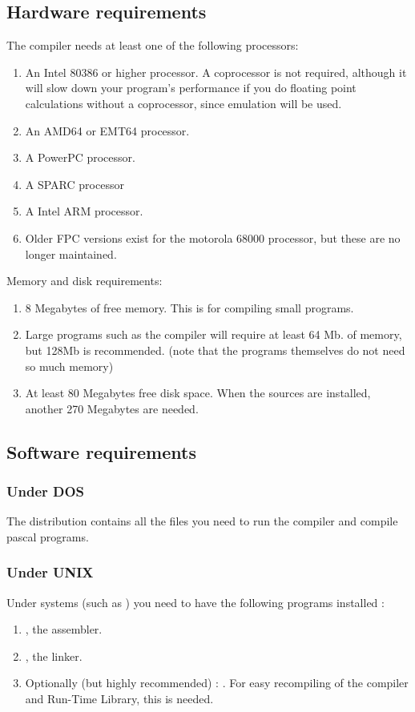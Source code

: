 \subsection{Hardware requirements}
The compiler needs at least one of the following processors:
\begin{enumerate}
\item An Intel 80386 or higher processor. A coprocessor 
is not required, although it will slow down your program's performance if you do 
floating point calculations without a coprocessor, since emulation will be used.
\item An AMD64 or EMT64 processor. 
\item A PowerPC processor. 
\item A SPARC processor
\item A Intel ARM processor.
\item Older FPC versions exist for the motorola 68000 processor, 
but these are no longer maintained.
\end{enumerate}


Memory and disk requirements:
\begin{enumerate}
\item 8 Megabytes of free memory. This is for compiling small programs. 
\item Large programs such as the compiler will require at least 64 Mb. 
of memory, but 128Mb is recommended. 
(note that the programs themselves do not need so much memory)
\item At least 80 Megabytes free disk space. 
When the sources are installed, another 270 Megabytes are needed.
\end{enumerate}

\subsection{Software requirements}

\subsubsection{Under DOS}
The \dos distribution contains all the files you need to run the compiler
and compile pascal programs.

\subsubsection{Under UNIX}
Under \unix systems (such as \linux) you need to have the following programs 
installed :
\begin{enumerate}
\item \gnu {}, the \gnu assembler.
\item \gnu {}, the \gnu linker.
\item Optionally (but highly recommended) : \gnu {}. For easy
recompiling of the compiler and Run-Time Library, this is needed.
\end{enumerate}

